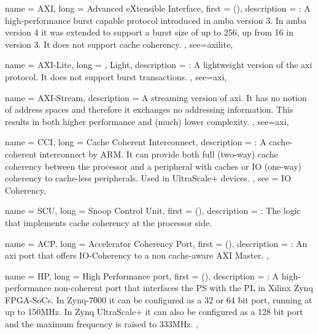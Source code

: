 {
	name = {AXI},
	long = {Advanced eXtensible Interface},
	first = { ()},
	description = {\emph{}:
		A high-performance \gls{burst} capable protocol introduced in \gls{amba} version 3.
		In \gls{amba} version 4 it was extended to support a \gls{burst} size of up to 256,
		up from 16 in version 3. It does not support cache coherency.
	},
	see={axilite},
}


{
	name = {AXI-Lite},
	long = {, Light},
	description = {\emph{}:
		A lightweight version of the \gls{axi} protocol. 
		It does not support \gls{burst} transactions.
	},
	see={axi},
}

{
	name = {AXI-Stream},
	description = {
		A streaming version of \gls{axi}. It has no notion of address spaces
		and therefore it exchanges no addressing information. 
		This results in both higher performance and (much) lower complexity.
	},
	see={axi},
}



{
	name = {CCI},
	long = {Cache Coherent Interconnect},
	description = {\emph{}:
		A cache-coherent interconnect by ARM. 
		It can provide both full (two-way) cache coherency between the processor and
		a peripheral with caches or IO (one-way) coherency to cache-less
		peripherals. Used in UltraScale+ devices.
	},
	see = {IO Coherency},
}


{
	name = {SCU},
	long = {Snoop Control Unit},
	first = { ()},
	description = {\emph{}:
		The logic that implements cache coherency at the processor side.
	}
}

{
	name = {ACP},
	long = {Accelerator Coherency Port},
	first = { ()},
	description = {\emph{}:
		An \gls{axi} port that offers IO-Coherency to a non cache-aware AXI Master.
	},
}


{
	name = {HP},
	long = {High Performance port},
	first = { ()},
	description = {\emph{}:
		A high-performance non-coherent port that interfaces 
		the PS with the PL in Xilinx Zynq FPGA-SoCs.
		In Zynq-7000 it can be configured as a 32 or 64 bit port, running at up to 150MHz.
		In Zynq UltraScale+ it can also be configured as a 128 bit port and the maximum
		frequency is raised to 333MHz.
	},
}

